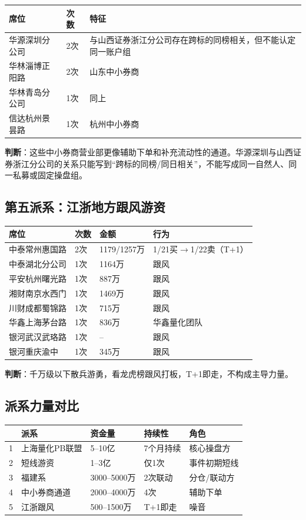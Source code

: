 \documentclass[a4paper,11pt,fontset=none]{ctexart}
\begin{document}
\begin{tabularx}{\textwidth}{L{3.5cm}L{1.5cm}X}
\toprule
\textbf{席位} & \textbf{次数} & \textbf{特征} \\
\midrule
华源深圳分公司 & 2次 & 与山西证券浙江分公司存在跨标的同榜相关，但不能认定同一账户组 \\
华林淄博正阳路 & 2次 & 山东中小券商 \\
华林青岛分公司 & 1次 & 同上 \\
信达杭州景昙路 & 1次 & 杭州中小券商 \\
\bottomrule
\end{tabularx}

\textbf{判断}：这些中小券商营业部更像辅助下单和补充流动性的通道。华源深圳与山西证券浙江分公司的关系只能写到“跨标的同榜/同日相关”，不能写成同一自然人、同一私募或固定操盘组。

\subsection*{第五派系：江浙地方跟风游资}

\begin{tabularx}{\textwidth}{L{3.5cm}L{1.5cm}L{1.5cm}X}
\toprule
\textbf{席位} & \textbf{次数} & \textbf{金额} & \textbf{行为} \\
\midrule
中泰常州惠国路 & 2次 & 1179/1257万 & 1/21买$\to$1/22卖（T+1） \\
中泰湖北分公司 & 1次 & 1164万 & 跟风 \\
平安杭州曙光路 & 1次 & 887万 & 跟风 \\
湘财南京水西门 & 1次 & 1469万 & 跟风 \\
川财成都蜀锦路 & 1次 & 715万 & 跟风 \\
华鑫上海茅台路 & 1次 & 836万 & 华鑫量化团队 \\
银河武汉武珞路 & 1次 & -- & 跟风 \\
银河重庆渝中 & 1次 & 345万 & 跟风 \\
\bottomrule
\end{tabularx}

\textbf{判断}：千万级以下散兵游勇，看龙虎榜跟风打板，T+1即走，不构成主导力量。

\subsection*{派系力量对比}

\begin{tabularx}{\textwidth}{L{0.5cm}L{3.5cm}L{2cm}L{2cm}X}
\toprule
 & \textbf{派系} & \textbf{资金量} & \textbf{持续性} & \textbf{角色} \\
 & 上海量化PB联盟 & 5--10亿 & 7个月持续 & 核心操盘方 \\
2 & 短线游资 & 1--3亿 & 仅1次 & 事件初期短线 \\
3 & 福建系 & 3000--5000万 & 2次联动 & 分仓/联动方 \\
4 & 中小券商通道 & 2000--4000万 & 4次 & 辅助下单 \\
5 & 江浙跟风 & 500--1500万 & T+1即走 & 噪音 \\
\bottomrule
\end{tabularx}
\end{document}
